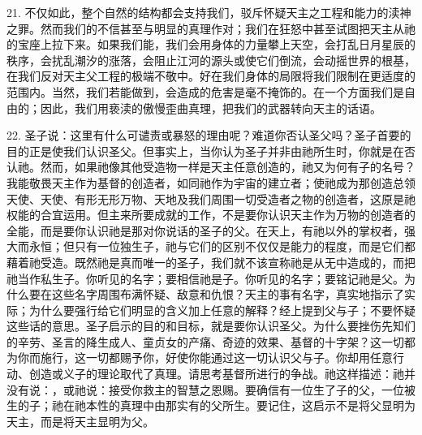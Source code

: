 21. 不仅如此，整个自然的结构都会支持我们，驳斥怀疑天主之工程和能力的渎神之罪。然而我们的不信甚至与明显的真理作对；我们在狂怒中甚至试图把天主从祂的宝座上拉下来。如果我们能，我们会用身体的力量攀上天空，会打乱日月星辰的秩序，会扰乱潮汐的涨落，会阻止江河的源头或使它们倒流，会动摇世界的根基，在我们反对天主父工程的极端不敬中。好在我们身体的局限将我们限制在更适度的范围内。当然，我们若能做到，会造成的危害是毫不掩饰的。在一个方面我们是自由的；因此，我们用亵渎的傲慢歪曲真理，把我们的武器转向天主的话语。\par

22. 圣子说：这里有什么可谴责或暴怒的理由呢？难道你否认圣父吗？圣子首要的目的正是使我们认识圣父。但事实上，当你认为圣子并非由祂所生时，你就是在否认祂。然而，如果祂像其他受造物一样是天主任意创造的，祂又为何有子的名号？我能敬畏天主作为基督的创造者，如同祂作为宇宙的建立者；使祂成为那创造总领天使、天使、有形无形万物、天地及我们周围一切受造者之物的创造者，这原是祂权能的合宜运用。但主来所要成就的工作，不是要你认识天主作为万物的创造者的全能，而是要你认识祂是那对你说话的圣子的父。在天上，有祂以外的掌权者，强大而永恒；但只有一位独生子，祂与它们的区别不仅仅是能力的程度，而是它们都藉着祂受造。既然祂是真而唯一的圣子，我们就不该宣称祂是从无中造成的，而把祂当作私生子。你听见的名字；要相信祂是子。你听见的名字；要铭记祂是父。为什么要在这些名字周围布满怀疑、敌意和仇恨？天主的事有名字，真实地指示了实际；为什么要强行给它们明显的含义加上任意的解释？经上提到父与子；不要怀疑这些话的意思。圣子启示的目的和目标，就是要你认识圣父。为什么要挫伤先知们的辛劳、圣言的降生成人、童贞女的产痛、奇迹的效果、基督的十字架？这一切都为你而施行，这一切都赐予你，好使你能通过这一切认识父与子。你却用任意行动、创造或义子的理论取代了真理。请思考基督所进行的争战。祂这样描述：祂并没有说：，或祂说：接受你救主的智慧之恩赐。要确信有一位生了子的父，一位被生的子；祂在祂本性的真理中由那实有的父所生。要记住，这启示不是将父显明为天主，而是将天主显明为父。\par

